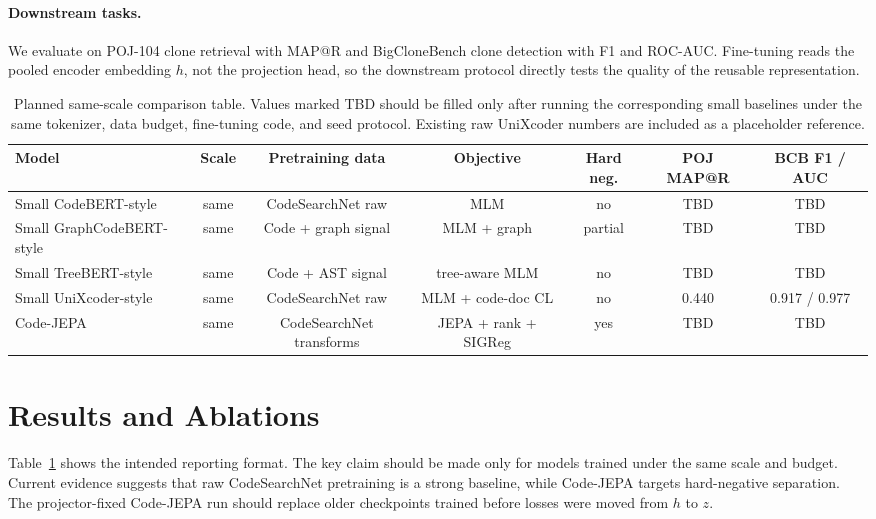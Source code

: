\documentclass[11pt]{article}
\begin{document}
\paragraph{Downstream tasks.}
We evaluate on POJ-104 clone retrieval with MAP@R and BigCloneBench clone
detection with F1 and ROC-AUC. Fine-tuning reads the pooled encoder embedding
\(h\), not the projection head, so the downstream protocol directly tests the
quality of the reusable representation.

\begin{table}[t]
  \centering
  \small
  \begin{tabular}{lcccccc}
    \hline
    \textbf{Model} & \textbf{Scale} & \textbf{Pretraining data} & \textbf{Objective} &
    \textbf{Hard neg.} & \textbf{POJ MAP@R} & \textbf{BCB F1 / AUC} \\
    \hline
    Small CodeBERT-style & same & CodeSearchNet raw & MLM & no & TBD & TBD \\
    Small GraphCodeBERT-style & same & Code + graph signal & MLM + graph & partial & TBD & TBD \\
    Small TreeBERT-style & same & Code + AST signal & tree-aware MLM & no & TBD & TBD \\
    Small UniXcoder-style & same & CodeSearchNet raw & MLM + code-doc CL & no & 0.440 & 0.917 / 0.977 \\
    Code-JEPA & same & CodeSearchNet transforms & JEPA + rank + SIGReg & yes & TBD & TBD \\
    \hline
  \end{tabular}
  \caption{Planned same-scale comparison table. Values marked TBD should be
  filled only after running the corresponding small baselines under the same
  tokenizer, data budget, fine-tuning code, and seed protocol. Existing raw
  UniXcoder numbers are included as a placeholder reference.}
  \label{tab:comparison}
\end{table}

\section{Results and Ablations}

Table~\ref{tab:comparison} shows the intended reporting format. The key claim
should be made only for models trained under the same scale and budget. Current
evidence suggests that raw CodeSearchNet pretraining is a strong baseline, while
Code-JEPA targets hard-negative separation. The projector-fixed Code-JEPA run
should replace older checkpoints trained before losses were moved from \(h\) to
\(z\).
\end{document}
